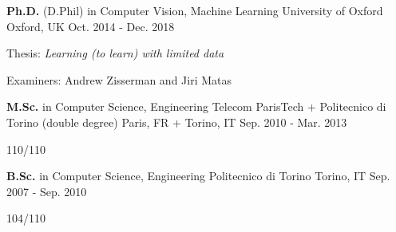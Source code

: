 

\begin{cventries}

  \cventry
    {\textbf{Ph.D.} (D.Phil) in Computer Vision, Machine Learning} %
    {University of Oxford} %
    {Oxford, UK} %
    {Oct. 2014 - Dec. 2018} %
    {
      \begin{cvitems} %
	  \item {Thesis: \emph{Learning (to learn) with limited data}}
	  \item {Examiners: Andrew Zisserman and Jiri Matas}
      \end{cvitems}
    }

  \cventry
    {\textbf{M.Sc.} in Computer Science, Engineering} %
    {Telecom ParisTech + Politecnico di Torino (double degree)} %
    {Paris, FR + Torino, IT} %
    {Sep. 2010 - Mar. 2013} %
    {
      \begin{cvitems} %
        \item {110/110}
      \end{cvitems}
    }

  \cventry
    {\textbf{B.Sc.} in Computer Science, Engineering} %
    {Politecnico di Torino} %
    {Torino, IT} %
    {Sep. 2007 - Sep. 2010} %
    {
      \begin{cvitems} %
        \item {104/110}
      \end{cvitems}
    }  
\end{cventries}

